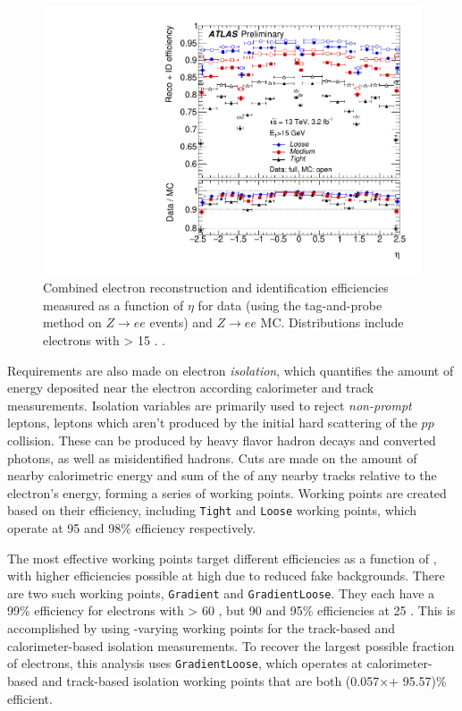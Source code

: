 \begin{centering}
\begin{figure}[!hbt]
\myfloatalign
\includegraphics[width=.90\linewidth]{figures/reco/fig_14b.pdf}
\caption{ Combined electron reconstruction and identification efficiencies measured as a function of $\eta$ for data (using the tag-and-probe method on $Z\rightarrow ee$ events) and $Z\rightarrow ee$ \ac{MC}. Distributions include electrons with \et > 15 \gev. \cite{ATLAS-CONF-2016-024}.}
\label{fig:reco_el_sf}
\end{figure}
\end{centering}

Requirements are also made on electron \textit{isolation}, which quantifies the amount of energy deposited near the electron according calorimeter and track measurements. Isolation variables are primarily used to reject \textit{non-prompt} leptons, leptons which aren't produced by the initial hard scattering of the $pp$ collision. These can be produced by heavy flavor hadron decays and converted photons, as well as misidentified hadrons. Cuts are made on the amount of nearby calorimetric energy and sum of the \pt of any nearby tracks relative to the electron's energy, forming a series of working points. Working points are created based on their efficiency, including \texttt{Tight} and \texttt{Loose} working points, which operate at 95 and 98\% efficiency respectively. 

The most effective working points target different efficiencies as a function of \pt, with higher efficiencies possible at high \pt due to reduced fake backgrounds. There are two such working points, \texttt{Gradient} and \texttt{GradientLoose}. They each have a 99\% efficiency for electrons with \pt > 60 \gev, but 90 and 95\% efficiencies at 25 \gev. This is accomplished by using \pt-varying working points for the track-based and calorimeter-based isolation measurements. To recover the largest possible fraction of electrons, this analysis uses \texttt{GradientLoose}, which operates at calorimeter-based and track-based isolation working points that are both (0.057$\times$\pt + 95.57)\% efficient. 

